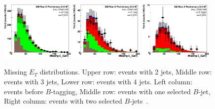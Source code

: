 \begin{figure}[!h!tbp]
\begin{center}
\includegraphics[width=0.32\textwidth]{eps/DataBackground/EMU/emu_EqZeroTag_EqFourJet_MissingEt.eps}
\includegraphics[width=0.32\textwidth]{eps/DataBackground/EMU/emu_EqOneTag_EqFourJet_MissingEt.eps}
\includegraphics[width=0.32\textwidth]{eps/DataBackground/EMU/emu_EqTwoTag_EqFourJet_MissingEt.eps}
\end{center}
\vspace{-0.1in}
\caption{Missing $E_{T}$ distributions. Upper row: events with 2 jets, Middle row: events with 3 jets, Lower row: events with 4 jets. Left column: events before $B$-tagging, Middle row: events with one selected $B$-jet, Right column: events with two selected $B$-jets~\cite{singletopnote}.}
\label{MissingEt}
\end{figure}







